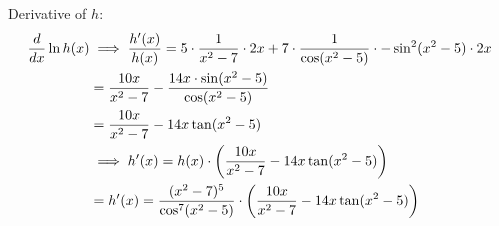 \documentclass[nooutcomes]{ximera}
\begin{document}
\begin{problem}
\begin{enumerate}
\begin{freeResponse}
            Derivative of $h$:
            \begin{align*}
              \frac{d}{dx} \ln h(x) &\implies \frac{h'(x)}{h(x)} = 5 \cdot \frac{1}{x^2 - 7} \cdot 2x + 7 \cdot\frac{1}{\cos(x^2 - 5)} \cdot - \sin^2(x^2-5) \cdot 2x\\
                            &= \frac{10x}{x^2-7} - \frac{14x \cdot \sin(x^2 - 5)}{\cos(x^2 - 5)}\\
              &= \frac{10x}{x^2-7} - 14x \tan(x^2-5) \\
              &\implies h'(x) = h(x)\cdot \left( \frac{10x}{x^2-7} - 14x \tan(x^2-5) \right) \\
              &= h'(x) = \frac{(x^2 - 7)^5}{\cos^7(x^2 - 5)} \cdot \left( \frac{10x}{x^2-7} - 14x \tan(x^2-5) \right)
            \end{align*}
	\end{freeResponse}
	\end{enumerate}
\end{problem}
\end{document}
